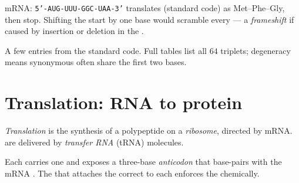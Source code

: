 \begin{example}\label{ex:g11:gene-expression:frame}
mRNA: \texttt{5'-AUG-UUU-GGC-UAA-3'} translates (standard code) as
Met--Phe--Gly, then stop. Shifting the start by one base would scramble every
 --- a \emph{frameshift} if caused by insertion or deletion in the .
\end{example}

\begin{omfigure}

{\small A few entries from the standard code. Full tables list all $64$
triplets; degeneracy means synonymous  often share the first two bases.}
\end{omfigure}

\section{Translation: RNA to protein}

\begin{definition}[Translation]\label{def:g11:gene-expression:translation}
\emph{Translation} is the synthesis of a polypeptide on a
\emph{ribosome}, directed by mRNA.  are delivered by
\emph{transfer RNA} (tRNA) molecules.
\end{definition}

\begin{definition}\label{def:g11:gene-expression:trna}
Each  carries one  and exposes a three-base
\emph{anticodon} that base-pairs with the  mRNA
. The  that attaches the correct  to each  enforces
the  chemically.
\end{definition}

